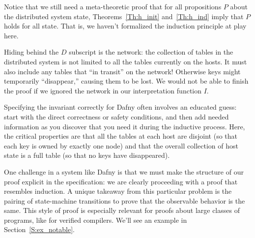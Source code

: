 Notice that we still need a meta-theoretic proof that for all propositions \(P\)
about the distributed system state, Theorems~\ref{Th:h_init} and~\ref{Th:h_ind}
imply that \(P\) holds for all state. That is, we haven't formalized the
induction principle at play here.

\begin{rem}
    Hiding behind the \(D\) subscript is the network: the collection of tables
    in the distributed system is not limited to all the tables currently on the
    hosts. It must also include any tables that ``in transit'' on the network!
    Otherwise keys might temporarily ``disappear,'' causing them to be lost. We
    would not be able to finish the proof if we ignored the network in our
    interpretation function \(I\).
\end{rem}

Specifying the invariant correctly for Dafny often involves an educated guess:
start with the direct correctness or safety conditions, and then add needed
information as you discover that you need it during the inductive process. Here,
the critical properties are that all the tables at each host are disjoint (so
that each key is owned by exactly one node) and that the overall collection of
host state is a full table (so that no keys have disappeared).

One challenge in a system like Dafny is that we must make the structure of our
proof explicit in the specification: we are clearly proceeding with a proof that
resembles induction. A unique takeaway from this particular problem is the
pairing of state-machine transitions to prove that the observable behavior is
the same. This style of proof is especially relevant for proofs about large
classes of programs, like for verified compilers. We'll see an example in
Section~\ref{S:ex_notable}.

